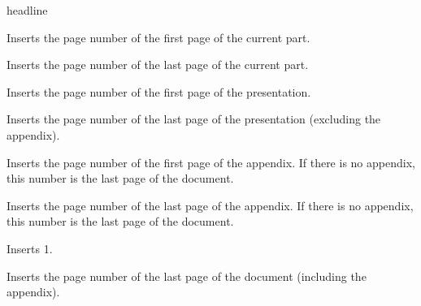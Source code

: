 \begin{element}{headline}
\begin{itemize}
    \iteminsert{\insertpartstartpage}
    Inserts the page number of the first page of the current part.

    \iteminsert{\insertpartendpage}
    Inserts the page number of the last page of the current part.

    \iteminsert{\insertpresentationstartpage}
    Inserts the page number of the first page of the presentation.

    \iteminsert{\insertpresentationendpage}
    Inserts the page number of the last page of the presentation
    (excluding the appendix).


    \iteminsert{\insertappendixstartpage}
    Inserts the page number of the first page of the appendix. If there
    is no appendix, this number is the last page of the document.

    \iteminsert{\insertappendixendpage}
    Inserts the page number of the last page of the appendix. If there
    is no appendix, this number is the last page of the document.

    \iteminsert{\insertdocumentstartpage}
    Inserts 1.

    \iteminsert{\insertdocumentendpage}
    Inserts the page number of the last page of the document (including
    the appendix).
  \end{itemize}
\end{element}

